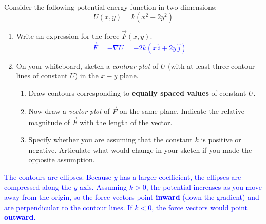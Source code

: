 \documentclass[11pt, letterpaper, openany]{book}
\newenvironment{exercise}[1][Exercise]{%
  \tcolorbox[blanker, breakable, left=1em,
    before skip=1em, after skip=1em,
    borderline west={3pt}{0pt}{PhysNavy},
    colback=PhysCream,
    before upper={\textcolor{PhysNavy}{\sffamily\bfseries #1:}\space}
  ]%
}{%
  \endtcolorbox%
}
\begin{document}
\begin{exercise}[Exercise 3]
Consider the following potential energy function in two dimensions:
\[ U(x,y) = k(x^2 + 2y^2) \]
\begin{enumerate}
    \item Write an expression for the force $\vec{F}(x,y)$. \\
    \textcolor{blue}{\[ \vec{F} = -\nabla U = -2k(x\,\hat{i} + 2y\,\hat{j}) \]}
    
    \item On your whiteboard, sketch a \textit{contour plot} of $U$ (with at least three contour lines of constant $U$) in the $x-y$ plane.
    \begin{enumerate}[label=(\alph*)]
        \item Draw contours corresponding to \textbf{equally spaced values} of constant $U$.
        \item Now draw a \textit{vector plot} of $\vec{F}$ on the same plane. Indicate the relative magnitude of $\vec{F}$ with the length of the vector.
        \item Specify whether you are assuming that the constant $k$ is positive or negative. Articulate what would change in your sketch if you made the opposite assumption.
    \end{enumerate}
\end{enumerate}
\begin{center}
\end{center}
\textcolor{blue}{The contours are ellipses. Because $y$ has a larger coefficient, the ellipses are compressed along the $y$-axis. Assuming $k>0$, the potential increases as you move away from the origin, so the force vectors point \textbf{inward} (down the gradient) and are perpendicular to the contour lines. If $k<0$, the force vectors would point \textbf{outward}.}
\end{exercise}
\end{document}
